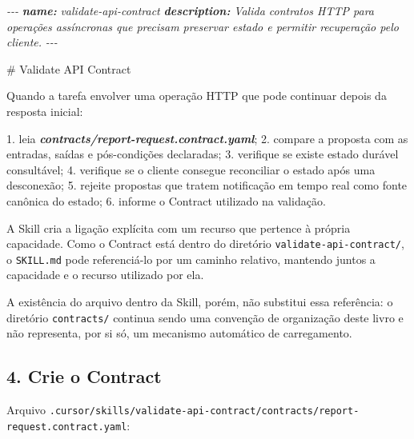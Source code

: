 \documentclass[
  10pt,
  a4paper,
  oneside]{book}
\newenvironment{Shaded}{}{}
\newcommand{\AnnotationTok}[1]{\textcolor[rgb]{0.38,0.63,0.69}{\textbf{\textit{#1}}}}
\newcommand{\CommentTok}[1]{\textcolor[rgb]{0.38,0.63,0.69}{\textit{#1}}}
\newcommand{\FunctionTok}[1]{\textcolor[rgb]{0.02,0.16,0.49}{#1}}
\newcommand{\InformationTok}[1]{\textcolor[rgb]{0.38,0.63,0.69}{\textbf{\textit{#1}}}}
\newcommand{\NormalTok}[1]{#1}
\newcommand{\SpecialStringTok}[1]{\textcolor[rgb]{0.73,0.40,0.53}{#1}}
\renewenvironment{Shaded}{\begin{snugshade}}{\end{snugshade}}%
\begin{document}
\begin{Shaded}
\begin{Highlighting}[]
\CommentTok{{-}{-}{-}}
\AnnotationTok{name:}\CommentTok{ validate{-}api{-}contract}
\AnnotationTok{description:}\CommentTok{ Valida contratos HTTP para operações assíncronas que precisam preservar estado e permitir recuperação pelo cliente.}
\CommentTok{{-}{-}{-}}

\FunctionTok{\# Validate API Contract}

\NormalTok{Quando a tarefa envolver uma operação HTTP que pode continuar depois da resposta inicial:}

\SpecialStringTok{1. }\NormalTok{leia }\InformationTok{\textasciigrave{}contracts/report{-}request.contract.yaml\textasciigrave{}}\NormalTok{;}
\SpecialStringTok{2. }\NormalTok{compare a proposta com as entradas, saídas e pós{-}condições declaradas;}
\SpecialStringTok{3. }\NormalTok{verifique se existe estado durável consultável;}
\SpecialStringTok{4. }\NormalTok{verifique se o cliente consegue reconciliar o estado após uma desconexão;}
\SpecialStringTok{5. }\NormalTok{rejeite propostas que tratem notificação em tempo real como fonte canônica do estado;}
\SpecialStringTok{6. }\NormalTok{informe o Contract utilizado na validação.}
\end{Highlighting}
\end{Shaded}

A Skill cria a ligação explícita com um recurso que pertence à própria
capacidade. Como o Contract está dentro do diretório
\texttt{validate-api-contract/}, o \texttt{SKILL.md} pode referenciá-lo
por um caminho relativo, mantendo juntos a capacidade e o recurso
utilizado por ela.

A existência do arquivo dentro da Skill, porém, não substitui essa
referência: o diretório \texttt{contracts/} continua sendo uma convenção
de organização deste livro e não representa, por si só, um mecanismo
automático de carregamento.

\hypertarget{crie-o-contract}{%
\subsection{4. Crie o Contract}\label{crie-o-contract}}

Arquivo
\texttt{.cursor/skills/validate-api-contract/contracts/report-request.contract.yaml}:
\end{document}
